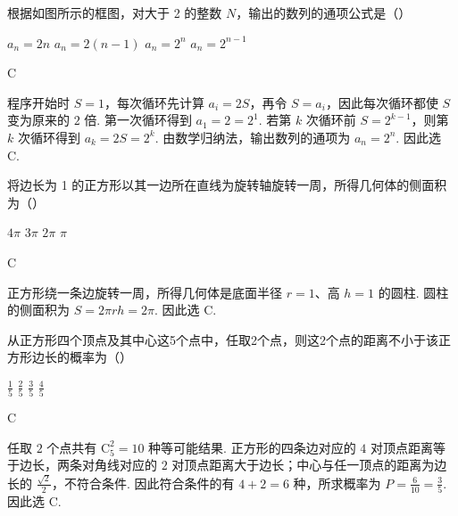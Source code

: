 \begin{problem}
根据如图所示的框图，对大于 2 的整数 \(N\)，输出的数列的通项公式是（\quad）


\choices
    {\(a_{n} = 2n\)}
    {\(a_{n} = 2(n - 1)\)}
    {\(a_{n} = 2^{n}\)}
    {\(a_{n} = 2^{n - 1}\)}
\begin{answer}
C
\end{answer}
\begin{solution}
程序开始时 \(S=1\)，每次循环先计算 \(a_i=2S\)，再令 \(S=a_i\)，因此每次循环都使 \(S\) 变为原来的 \(2\) 倍. 第一次循环得到 \(a_1=2=2^1\). 若第 \(k\) 次循环前 \(S=2^{k-1}\)，则第 \(k\) 次循环得到 \(a_k=2S=2^k\). 由数学归纳法，输出数列的通项为 \(a_n=2^n\). 因此选 C.
\end{solution}
\end{problem}

\begin{problem}
将边长为 1 的正方形以其一边所在直线为旋转轴旋转一周，所得几何体的侧面积为（\quad）

\choices
    {\(4\pi\)}
    {\(3\pi\)}
    {\(2\pi\)}
    {\(\pi\)}
\begin{answer}
C
\end{answer}
\begin{solution}
正方形绕一条边旋转一周，所得几何体是底面半径 \(r=1\)、高 \(h=1\) 的圆柱. 圆柱的侧面积为 \(S=2\pi rh=2\pi\).
因此选 C.
\end{solution}
\end{problem}

\begin{problem}
从正方形四个顶点及其中心这5个点中，任取2个点，则这2个点的距离不小于该正方形边长的概率为（\quad）

\choices
    {\(\frac{1}{5}\)}
    {\( \frac{2}{5} \)}
    {\( \frac{3}{5} \)}
    {\(\frac{4}{5}\)}
\begin{answer}
C
\end{answer}
\begin{solution}
任取 \(2\) 个点共有 \(\mathrm C_5^2=10\) 种等可能结果. 正方形的四条边对应的 \(4\) 对顶点距离等于边长，两条对角线对应的 \(2\) 对顶点距离大于边长；中心与任一顶点的距离为边长的 \(\frac{\sqrt{2}}{2}\)，不符合条件. 因此符合条件的有 \(4+2=6\) 种，所求概率为 \(P=\frac{6}{10}=\frac35\).
因此选 C.
\end{solution}
\end{problem}

